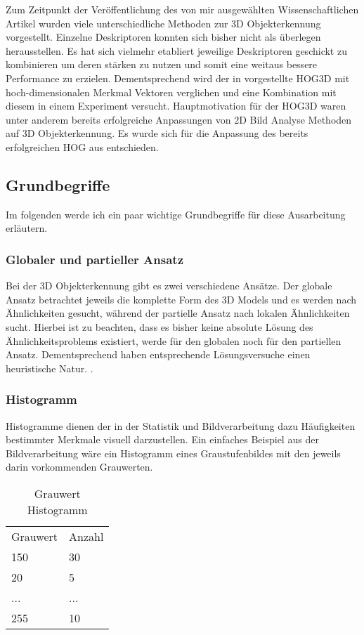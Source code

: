 Zum Zeitpunkt der Veröffentlichung des von mir ausgewählten Wissenschaftlichen Artikel wurden viele
unterschiedliche Methoden zur 3D Objekterkennung vorgestellt. Einzelne Deskriptoren konnten sich 
bisher nicht als überlegen herausstellen. Es hat sich vielmehr etabliert jeweilige Deskriptoren
geschickt zu kombinieren um deren stärken zu nutzen und somit eine weitaus bessere Performance zu erzielen.
Dementsprechend wird der in \cite{scherer2010histograms} vorgestellte HOG3D mit hoch-dimensionalen Merkmal Vektoren
verglichen und eine Kombination mit diesem in einem Experiment versucht.
\newline
Hauptmotivation für der HOG3D waren unter anderem bereits erfolgreiche Anpassungen von 2D Bild Analyse Methoden auf 3D Objekterkennung. Es wurde sich für die Anpassung des bereits erfolgreichen HOG aus \cite{dalal2005histograms} entschieden.


\subsection{Grundbegriffe}
Im folgenden werde ich ein paar wichtige Grundbegriffe für diese Ausarbeitung erläutern. 

\subsubsection{Globaler und partieller Ansatz}
Bei der 3D Objekterkennung gibt es zwei verschiedene Ansätze. Der globale Ansatz betrachtet jeweils die komplette Form des
3D Models und es werden nach Ähnlichkeiten gesucht, während der partielle Ansatz nach lokalen Ähnlichkeiten sucht. Hierbei ist zu beachten, dass es bisher keine absolute Lösung des Ähnlichkeitsproblems existiert, werde für den globalen noch für den partiellen Ansatz. Dementsprechend haben entsprechende Lösungsversuche einen heuristische Natur. \cite{scherer2010histograms}.

\subsubsection{Histogramm}
Histogramme dienen der in der Statistik und Bildverarbeitung dazu Häufigkeiten bestimmter Merkmale
visuell darzustellen. Ein einfaches Beispiel aus der Bildverarbeitung wäre ein Histogramm eines
Graustufenbildes mit den jeweils darin vorkommenden Grauwerten. 

\begin{table}[H]
	\centering
	\caption{Grauwert Histogramm}
	\label{bsp Histogramm}
	\begin{tabular}{ll}
		Grauwert & Anzahl \\
		150      & 30     \\
		20       & 5      \\
		...      & ...    \\
		255      & 10    
	\end{tabular}
\end{table}

